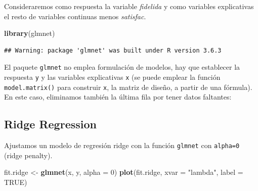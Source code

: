 \documentclass[]{book}
\newenvironment{Shaded}{\begin{snugshade}}{\end{snugshade}}
\newcommand{\DataTypeTok}[1]{\textcolor[rgb]{0.13,0.29,0.53}{#1}}
\newcommand{\DecValTok}[1]{\textcolor[rgb]{0.00,0.00,0.81}{#1}}
\newcommand{\KeywordTok}[1]{\textcolor[rgb]{0.13,0.29,0.53}{\textbf{#1}}}
\newcommand{\NormalTok}[1]{#1}
\newcommand{\OperatorTok}[1]{\textcolor[rgb]{0.81,0.36,0.00}{\textbf{#1}}}
\newcommand{\OtherTok}[1]{\textcolor[rgb]{0.56,0.35,0.01}{#1}}
\newcommand{\StringTok}[1]{\textcolor[rgb]{0.31,0.60,0.02}{#1}}
\begin{document}
Consideraremos como respuesta la variable \emph{fidelida} y como variables explicativas
el resto de variables continuas menos \emph{satisfac}.

\begin{Shaded}
\begin{Highlighting}[]
\KeywordTok{library}\NormalTok{(glmnet)}
\end{Highlighting}
\end{Shaded}

\begin{verbatim}
## Warning: package 'glmnet' was built under R version 3.6.3
\end{verbatim}

El paquete \texttt{glmnet} no emplea formulación de modelos, hay que establecer la respuesta
\texttt{y} y las variables explicativas \texttt{x} (se puede emplear la función \texttt{model.matrix()}
para construir \texttt{x}, la matriz de diseño, a partir de una fórmula).
En este caso, eliminamos también la última fila por tener datos faltantes:

\begin{Shaded}
\end{Shaded}

\hypertarget{ridge-regression}{%
\subsection{Ridge Regression}\label{ridge-regression}}

Ajustamos un modelo de regresión ridge con la función \texttt{glmnet} con \texttt{alpha=0} (ridge penalty).

\begin{Shaded}
\begin{Highlighting}[]
\NormalTok{fit.ridge <-}\StringTok{ }\KeywordTok{glmnet}\NormalTok{(x, y, }\DataTypeTok{alpha =} \DecValTok{0}\NormalTok{)}
\KeywordTok{plot}\NormalTok{(fit.ridge, }\DataTypeTok{xvar =} \StringTok{"lambda"}\NormalTok{, }\DataTypeTok{label =} \OtherTok{TRUE}\NormalTok{)}
\end{Highlighting}
\end{Shaded}
\end{document}

